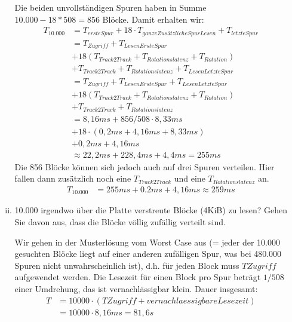 \begin{enumerate}[a)]
\begin{enumerate}[i)]
\begin{solution}
	Die beiden unvollständigen Spuren haben in Summe $10.000 - 18*508 = 856$ Blöcke.
	Damit erhalten wir:
	\begin{align*}
		T_{10.000} &= T_{erste Spur} + 18\cdot T_{ganze Zusätzliche Spur Lesen} + T_{letzte Spur}\\
		&= T_{Zugriff} + T_{Lesen Erste Spur}\\
		&+ 18 (T_{Track2Track} + T_{Rotationslatenz} + T_{Rotation})\\
		&+ T_{Track2Track} + T_{Rotationslatenz} + T_{Lesen Letzte Spur}\\
		&= T_{Zugriff} + T_{Lesen Erste Spur} + T_{Lesen Letzte Spur}\\
		&+ 18 (T_{Track2Track} + T_{Rotationslatenz} + T_{Rotation})\\
		&+ T_{Track2Track} + T_{Rotationslatenz}\\
		&= 8,16ms + 856/508 \cdot 8,33 ms\\
		&+ 18 \cdot (0,2ms + 4,16ms + 8,33ms)\\
		&+ 0,2ms + 4,16ms\\
		&\approx 22,2ms + 228,4ms + 4,4ms = 255ms
	\end{align*}
	Die 856 Blöcke können sich jedoch auch auf drei Spuren verteilen.
	Hier fallen dann zusätzlich noch eine $T_{Track2Track}$ und eine $T_{Rotationslatenz}$ an.
	\begin{align*}
		T_{10.000} &= 255ms + 0.2ms + 4,16ms \approx 259ms
	\end{align*}
\end{solution}


		\item 10.000 irgendwo über die Platte verstreute Blöcke (4KiB) zu lesen?
		Gehen Sie davon aus, dass die Blöcke völlig zufällig verteilt sind.

		\begin{solution}
		Wir gehen in der Musterlösung vom Worst Case aus (= jeder der 10.000 gesuchten Blöcke liegt auf einer anderen zufälligen Spur, was bei 480.000 Spuren nicht unwahrscheinlich ist), d.h. für jeden Block muss $TZugriff$ aufgewendet werden.
		Die Lesezeit für einen Block pro Spur beträgt $1/508$ einer Umdrehung, das ist vernachlässigbar klein.
		Dauer insgesamt: 
		\begin{align*}
			T &= 10000 \cdot ( TZugriff + vernachlaessigbare Lesezeit)\\
			&= 10000 \cdot 8,16ms = 81,6s
		\end{align*}
		\end{solution}


\end{enumerate}
\end{enumerate}
